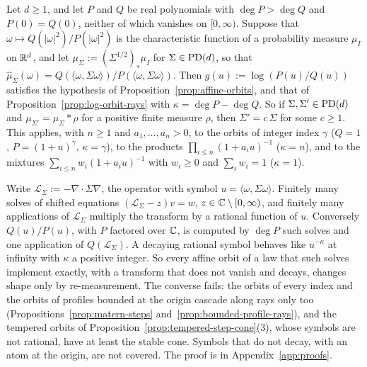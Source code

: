 \begin{proposition}\label{prop:rational-symbols}
Let $d \ge 1$, and let $P$ and $Q$ be real polynomials with $\operatorname{deg}P > \operatorname{deg}Q$ and $P(0) = Q(0)$,
neither of which vanishes on $[0,\infty)$. Suppose that $\omega \mapsto Q(|\omega|^2)/P(|\omega|^2)$
is the characteristic function of a probability measure $\mu_I$ on $\mathbb{R}^d$, and let
$\mu_\Sigma := (\Sigma^{1/2})_*\mu_I$ for $\Sigma \in \mathrm{PD}(d)$, so that
$\widehat\mu_\Sigma(\omega) = Q(\langle\omega,\Sigma\omega\rangle)/P(\langle\omega,\Sigma\omega\rangle)$.
Then $g(u) := \log(P(u)/Q(u))$ satisfies the hypothesis of Proposition~\ref{prop:affine-orbits}, and that of
Proposition~\ref{prop:log-orbit-rays} with $\kappa = \operatorname{deg}P - \operatorname{deg}Q$. So if $\Sigma, \Sigma' \in \mathrm{PD}(d)$ and
$\mu_{\Sigma'} = \mu_\Sigma * \rho$ for a positive finite measure $\rho$, then $\Sigma' = c\,\Sigma$ for
some $c \ge 1$. This applies, with $n \ge 1$ and $a_1, \dots, a_n > 0$, to the \Matern{} orbits of integer index
$\gamma$ ($Q = 1$, $P = (1+u)^\gamma$, $\kappa = \gamma$), to the products
$\prod_{i\le n}(1 + a_iu)^{-1}$ ($\kappa = n$), and to the mixtures $\sum_{i\le n}w_i(1 + a_iu)^{-1}$
with $w_i \ge 0$ and $\sum_iw_i = 1$ ($\kappa = 1$).
\end{proposition}

Write $\mathcal L_\Sigma := -\nabla\cdot\Sigma\nabla$, the operator with symbol $u = \langle\omega,\Sigma\omega\rangle$.
Finitely many solves of shifted equations $(\mathcal L_\Sigma - z)v = w$, $z \in \mathbb{C} \setminus [0,\infty)$, and
finitely many applications of $\mathcal L_\Sigma$ multiply the transform by a rational function of $u$.
Conversely $Q(u)/P(u)$, with $P$ factored over $\mathbb{C}$, is computed by $\operatorname{deg}P$ such solves
and one application of $Q(\mathcal L_\Sigma)$. A decaying rational symbol behaves like $u^{-\kappa}$ at infinity
with $\kappa$ a positive integer. So every affine orbit of a law that such solves implement exactly,
with a transform that does not vanish and decays, changes shape only by re-measurement. The converse
fails: the \Matern{} orbits of every index and the orbits of profiles bounded at the origin cascade
along rays only too (Propositions~\ref{prop:matern-steps} and~\ref{prop:bounded-profile-rays}), and the
tempered orbits of Proposition~\ref{prop:tempered-step-cone}(3), whose symbols are not rational, have
at least the stable cone. Symbols that do not decay, with an atom at the origin, are not covered.
The proof is in Appendix~\ref{app:proofs}.


